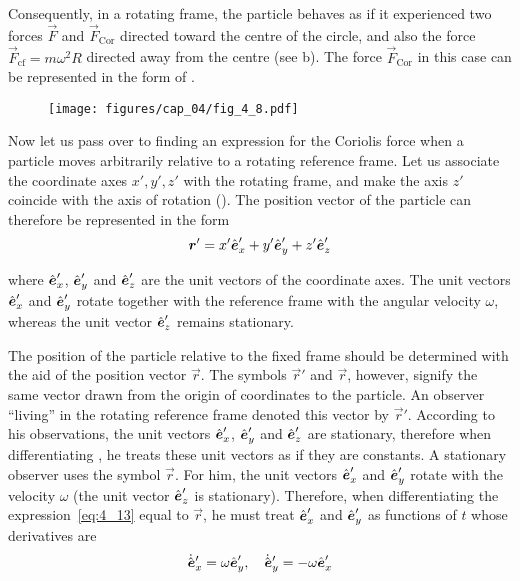 \noindent
Consequently, in a rotating frame, the particle behaves as if it experienced two forces $\vec{F}$ and $\vec{F}_{\text{Cor}}$ directed toward the centre of the circle, and also the force $\vec{F}_{\text{cf}}=m\omega^2R$ directed away from the centre (see b). The force $\vec{F}_{\text{Cor}}$ in this case can be represented in the form of .

\begin{figure}[t]
	\begin{center}
		\texttt{[image: figures/cap\_04/fig\_4\_8.pdf]}
		\caption[]{}
		\label{fig:4_8}
	\end{center}
\end{figure}

Now let us pass over to finding an expression for the Coriolis force when a particle moves arbitrarily relative to a rotating reference frame. Let us associate the coordinate axes $x', y', z'$ with the rotating frame, and make the axis $z'$ coincide with the axis of rotation (). The position vector of the particle can therefore be represented in the form
\begin{equation}\label{eq:4_13}
\boldsymbol{r}' = x'\hat{\boldsymbol{e}}_{x}' + y'\hat{\boldsymbol{e}}_{y}' + z'\hat{\boldsymbol{e}}_{z}'
\end{equation}

\noindent
where $\hat{\boldsymbol{e}}_{x}'$, $\hat{\boldsymbol{e}}_{y}'$ and $\hat{\boldsymbol{e}}_{z}'$ are the unit vectors of the coordinate axes. The unit vectors $\hat{\boldsymbol{e}}_{x}'$ and $\hat{\boldsymbol{e}}_{y}'$ rotate together with the reference frame with the angular velocity $\omega$, whereas the unit vector $\hat{\boldsymbol{e}}_{z}'$ remains stationary.

The position of the particle relative to the fixed frame should be determined with the aid of the position vector $\vec{r}$. The symbols $\vec{r}'$ and $\vec{r}$, however, signify the same vector drawn from the origin of coordinates to the particle. An observer ``living'' in the rotating reference frame denoted this vector by $\vec{r}'$. According to his observations, the unit vectors $\hat{\boldsymbol{e}}_{x}'$, $\hat{\boldsymbol{e}}_{y}'$ and $\hat{\boldsymbol{e}}_{z}'$ are stationary, therefore when differentiating , he treats these unit vectors as if they are constants. A stationary observer uses the symbol $\vec{r}$. For him, the unit vectors $\hat{\boldsymbol{e}}_{x}'$ and $\hat{\boldsymbol{e}}_{y}'$ rotate with the velocity $\omega$ (the unit vector $\hat{\boldsymbol{e}}_{z}'$ is stationary). Therefore, when differentiating the expression~\eqref{eq:4_13} equal to $\vec{r}$, he must treat $\hat{\boldsymbol{e}}_{x}'$ and $\hat{\boldsymbol{e}}_{y}'$ as functions of $t$ whose derivatives are
\begin{equation}\label{eq:4_14}
\dot{\hat{\boldsymbol{e}}}_x' = \omega\hat{\boldsymbol{e}}_{y}',\quad \dot{\hat{\boldsymbol{e}}}_y' = -\omega\hat{\boldsymbol{e}}_{x}'
\end{equation}


